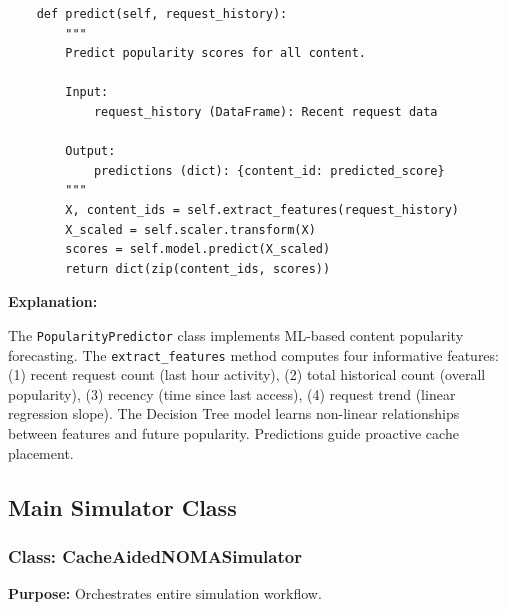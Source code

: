 \documentclass[12pt,a4paper]{article}
\begin{document}
\begin{verbatim}
    def predict(self, request_history):
        """
        Predict popularity scores for all content.
        
        Input:
            request_history (DataFrame): Recent request data
        
        Output:
            predictions (dict): {content_id: predicted_score}
        """
        X, content_ids = self.extract_features(request_history)
        X_scaled = self.scaler.transform(X)
        scores = self.model.predict(X_scaled)
        return dict(zip(content_ids, scores))
\end{verbatim}

\textbf{Explanation:}

The \texttt{PopularityPredictor} class implements ML-based content popularity forecasting. The \texttt{extract\_features} method computes four informative features: (1) recent request count (last hour activity), (2) total historical count (overall popularity), (3) recency (time since last access), (4) request trend (linear regression slope). The Decision Tree model learns non-linear relationships between features and future popularity. Predictions guide proactive cache placement.

\subsection{Main Simulator Class}

\subsubsection{Class: CacheAidedNOMASimulator}

\textbf{Purpose:} Orchestrates entire simulation workflow.
\end{document}
